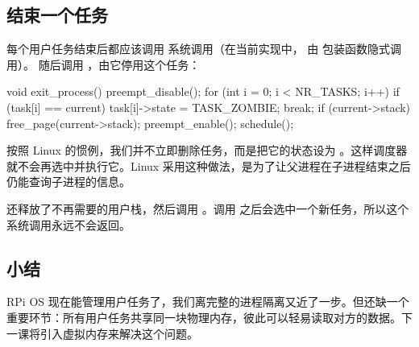 \subsection{结束一个任务}

每个用户任务结束后都应该调用  系统调用（在当前实现中， 由  包装函数隐式调用）。 随后调用 ，由它停用这个任务：

\begin{ccode}
void exit_process(){
	preempt_disable();
	for (int i = 0; i < NR_TASKS; i++){
		if (task[i] == current) {
			task[i]->state = TASK_ZOMBIE;
			break;
		}
	}
	if (current->stack) {
		free_page(current->stack);
	}
	preempt_enable();
	schedule();
}
\end{ccode}

按照 Linux 的惯例，我们并不立即删除任务，而是把它的状态设为 。这样调度器就不会再选中并执行它。Linux 采用这种做法，是为了让父进程在子进程结束之后仍能查询子进程的信息。

 还释放了不再需要的用户栈，然后调用 。调用  之后会选中一个新任务，所以这个系统调用永远不会返回。

\subsection{小结}

RPi OS 现在能管理用户任务了，我们离完整的进程隔离又近了一步。但还缺一个重要环节：所有用户任务共享同一块物理内存，彼此可以轻易读取对方的数据。下一课将引入虚拟内存来解决这个问题。
